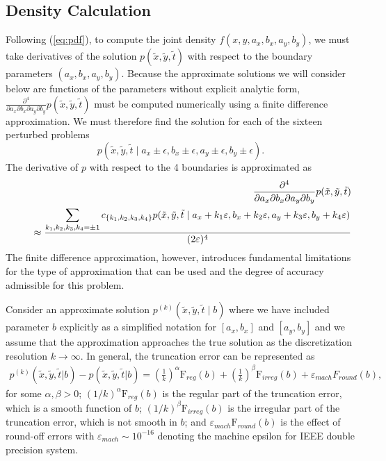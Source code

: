 \subsection{Density Calculation} \label{sec:likelihood-calc} Following
(\ref{eq:pdf}), to compute the joint density $f(x,y,a_x,b_x,a_y,b_y)$,
we must take derivatives of the solution
$p(\tilde{x},\tilde{y},\tilde{t})$ with respect to the boundary
parameters $(a_x, b_x, a_y, b_y)$. Because the approximate solutions
we will consider below are functions of the parameters without
explicit analytic form,
$\frac{\partial^4}{\partial a_x\partial b_x \partial a_y \partial
  b_y}p(\tilde{x},\tilde{y},\tilde{t})$ must be computed numerically
using a finite difference approximation. We must therefore find the
solution for each of the sixteen perturbed problems
\[
  p(\tilde{x},\tilde{y},\tilde{t} \mid a_x \pm \epsilon, b_x \pm \epsilon, a_y \pm \epsilon, b_y
  \pm \epsilon).
\]
The derivative of $p$ with respect to the 4 boundaries is approximated
as
\begin{eqnarray*}
& & \frac{\partial^4}{\partial a_x \partial b_x \partial a_y \partial b_y} p(\tilde{x},\tilde{y},\tilde{t})
\nonumber \\
& & \hspace*{0.5cm} \approx \frac{\displaystyle \sum_{k_1, k_2, k_3, k_4 = \pm 1}
c_{\{ k_1, k_2, k_3, k_4 \} } p( \tilde{x},\tilde{y},\tilde{t} \mid a_x+k_1 \varepsilon, b_x+k_2 \varepsilon,
a_y+k_3 \varepsilon, b_y+k_4 \varepsilon) }{(2 \varepsilon )^4}
\nonumber
\end{eqnarray*}
The finite difference approximation, however, introduces fundamental
limitations for the type of approximation that can be used and the
degree of accuracy admissible for this problem.

Consider an approximate solution
$p^{(k)}( \tilde{x},\tilde{y},\tilde{t} \mid b)$ where we
have included parameter $b $ explicitly as a simplified notation for
$[a_x, b_x]$ and $[a_y, b_y]$ and we assume that the approximation
approaches the true solution as the discretization resolution
$k \to \infty$. In general, the truncation error can be represented as
\begin{align}
  p^{(k)}(\tilde{x},\tilde{y},\tilde{t} | b) - p(\tilde{x},\tilde{y},\tilde{t} | b) = \left( \frac{1}{k}
  \right)^{\alpha} \mbox{F}_{reg}(b) + \left( \frac{1}{k}
  \right)^{\beta}\mbox{F}_{irreg}(b) + \varepsilon_{mach}F_{round}(b), \label{eq:trunc-error}
\end{align}
for some $\alpha, \beta > 0$; $(1/k)^{\alpha} \mbox{F}_{reg}(b) $ is
the regular part of the truncation error, which is a smooth function of $b$;
$(1/k)^{\beta} \mbox{F}_{irreg}(b) $ is the irregular part of the
truncation error, which is not smooth in $b$; and $\varepsilon_{mach} \mbox{F}_{round}(b) $ is the
effect of round-off errors with $\varepsilon_{mach} \sim 10^{-16}$
denoting the machine epsilon for IEEE double precision system.

